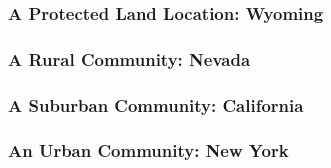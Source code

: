 \subsubsection{A Protected Land Location: Wyoming}

\subsubsection{A Rural Community: Nevada}

\subsubsection{A Suburban Community: California}

\subsubsection{An Urban Community: New York}

